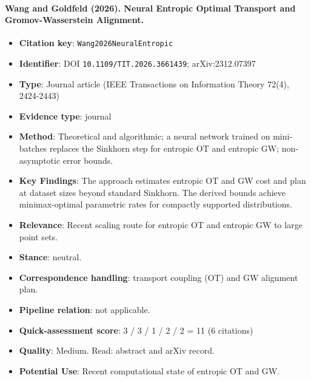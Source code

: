 \documentclass[journal,onecolumn]{IEEEtran}
\begin{document}
\paragraph{Wang and Goldfeld (2026). Neural Entropic Optimal Transport and Gromov-Wasserstein Alignment.~\cite{Wang2026NeuralEntropic}}\mbox{}

\begin{itemize}

\item{} \textbf{Citation key}: \texttt{Wang2026NeuralEntropic}

\item{} \textbf{Identifier}: DOI \nolinkurl{10.1109/TIT.2026.3661439}; arXiv:2312.07397

\item{} \textbf{Type}: Journal article (IEEE Transactions on Information Theory 72(4), 2424-2443)

\item{} \textbf{Evidence type}: journal

\item{} \textbf{Method}: Theoretical and algorithmic; a neural network trained on mini-batches replaces the Sinkhorn step for entropic OT and entropic GW; non-asymptotic error bounds.

\item{} \textbf{Key Findings}: The approach estimates entropic OT and GW cost and plan at dataset sizes beyond standard Sinkhorn. The derived bounds achieve minimax-optimal parametric rates for compactly supported distributions.

\item{} \textbf{Relevance}: Recent scaling route for entropic OT and entropic GW to large point sets.

\item{} \textbf{Stance}: neutral.

\item{} \textbf{Correspondence handling}: transport coupling (OT) and GW alignment plan.

\item{} \textbf{Pipeline relation}: not applicable.

\item{} \textbf{Quick-assessment score}: 3 / 3 / 1 / 2 / 2 = 11 (6 citations)

\item{} \textbf{Quality}: Medium. Read: abstract and arXiv record.

\item{} \textbf{Potential Use}: Recent computational state of entropic OT and GW.

\end{itemize}
\end{document}
